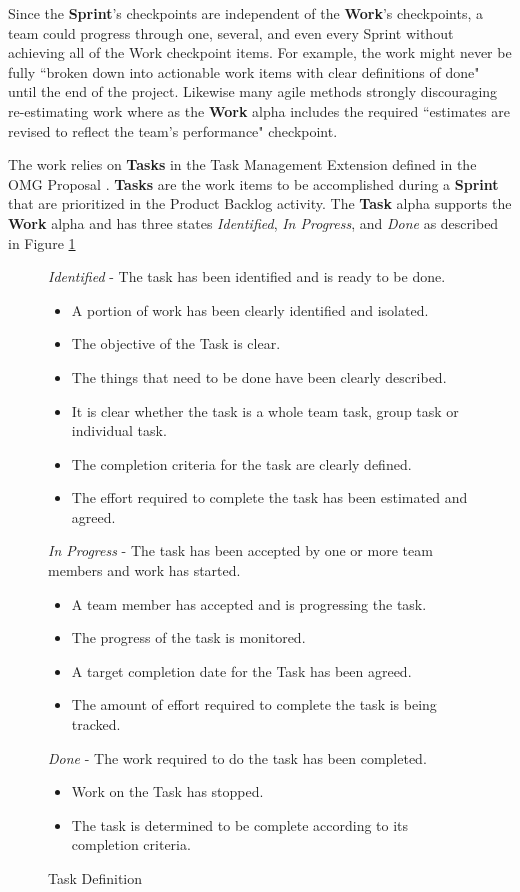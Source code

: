 \documentclass[preprint,12pt,3p]{elsarticle}
\begin{document}
Since the \textbf{Sprint}'s checkpoints are independent of the \textbf{Work}'s checkpoints, a team could progress through one, several, and even every Sprint without achieving all of the Work checkpoint items. For example, the work might never be fully ``broken down into actionable work items with clear definitions of done" until the end of the project. Likewise many agile methods strongly discouraging re-estimating work \cite{} where as the \textbf{Work} alpha includes the required ``estimates are revised to reflect the team’s performance" checkpoint. 



The work relies on \textbf{Tasks} in the Task Management Extension defined in the OMG Proposal \cite{OMGStandard}. \textbf{Tasks} are the work items to be accomplished during a \textbf{Sprint} that are prioritized in the Product Backlog activity. The \textbf{Task} alpha supports the \textbf{Work} alpha and has three states \textit{Identified}, \textit{In Progress}, and \textit{Done} as described in Figure \ref{TaskDefinition}

\begin{figure}[h]\vspace*{4pt}
\caption{Task Definition}\vspace*{-6pt}\label{TaskDefinition}
\textit{Identified} - The task has been identified and is ready to be done.
\begin{itemize}
\item A portion of work has been clearly identified and isolated.
\item The objective of the Task is clear.
\item The things that need to be done have been clearly described.
\item It is clear whether the task is a whole team task, group task or individual task.
\item The completion criteria for the task are clearly defined.
\item The effort required to complete the task has been estimated and agreed.
\end{itemize}

\textit{In Progress} - The task has been accepted by one or more team members and work has started.
\begin{itemize}
\item A team member has accepted and is progressing the task.
\item The progress of the task is monitored.
\item A target completion date for the Task has been agreed. 
\item The amount of effort required to complete the task is being tracked.
\end{itemize}

\textit{Done} - The work required to do the task has been completed.
\begin{itemize}
\item Work on the Task has stopped.
\item The task is determined to be complete according to its completion criteria. 
\end{itemize}
\end{figure}
\end{document}
